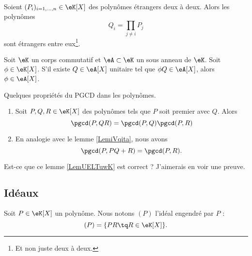 \begin{lemma}       \label{LemuALZHn}
    Soient \( (P_i)_{i=1,\ldots,n}\in \eK[X]\) des polynômes étrangers deux à deux. Alors les polynômes \begin{equation} Q_i=\prod_{j\neq i}P_j \end{equation}
    sont étrangers entre eux\footnote{Et non juste deux à deux.}.
\end{lemma}

\begin{lemma}   \label{LemzwkYdn}
    Soit \( \eK\) un corps commutatif et \( \eA\subset \eK\) un sous anneau de \( \eK\).  Soit \( \phi\in \eK[X]\). S'il existe \( Q\in \eA[X]\) unitaire tel que \( \phi Q\in \eA[X]\), alors \( \phi\in \eA[X]\).
\end{lemma}

\begin{lemma}   \label{LemUELTuwK}
    Quelques propriétés du PGCD dans les polynômes.
    \begin{enumerate}
        \item
            Soit \( P,Q,R\in \eK[X]\) des polynômes tels que \( P\) soit premier avec \( Q\). Alors
            \begin{equation}
                \pgcd(P,QR)=\pgcd(P,Q)\pgcd(P,R)
            \end{equation}
        \item
            En analogie avec le lemme \ref{LemiVqita}, nous avons
            \begin{equation}
                \pgcd(P,PQ+R)=\pgcd(P,R).
            \end{equation}
    \end{enumerate}
\end{lemma}
\begin{probleme}
    Est-ce que ce lemme \ref{LemUELTuwK} est correct ? J'aimerais en voir une preuve.
\end{probleme}

\subsection{Idéaux}

Soit \( P\in \eK[X]\) un polynôme. Nous notons \( (P)\) l'idéal engendré par \( P\) :
\begin{equation}        \label{EqDefxMkDtW}
    (P)=\{ PR\tq R\in\eK[X] \}.
\end{equation}

